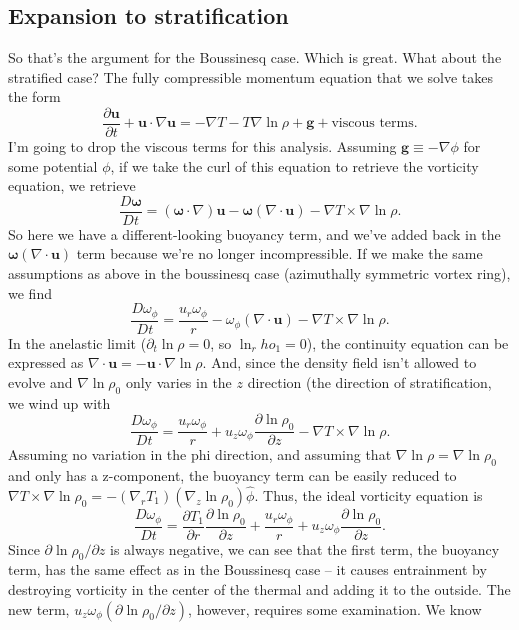 \documentclass[onecolumn, amsmath, amsfonts, amssymb]{aastex62}
\newcommand{\grad}{\ensuremath{\nabla}}
\begin{document}
\subsection{Expansion to stratification}
So that's the argument for the Boussinesq case. Which is great. What about the stratified
case?  The fully compressible momentum equation that we solve takes the form
$$
\frac{\partial\bm{u}}{\partial t} + \bm{u}\cdot\grad\bm{u} =
- \grad T - T \grad\ln\rho + \bm{g} + \text{viscous terms}.
$$
I'm going to drop the viscous terms for this analysis. Assuming $\bm{g} \equiv -\grad\phi$
for some potential $\phi$, if we take the curl of this equation to retrieve the vorticity equation,
we retrieve
$$
\frac{D\bm{\omega}}{D t} = %
(\bm{\omega}\cdot\grad)\bm{u} - \bm{\omega}(\grad\cdot\bm{u}) - \grad T \times \grad\ln\rho.
$$
So here we have a different-looking buoyancy term, and we've added back in the
$\bm{\omega}(\grad\cdot\bm{u})$ term because we're no longer incompressible. If we make the
same assumptions as above in the boussinesq case (azimuthally symmetric vortex ring), we find
$$
\frac{D\omega_\phi}{D t} = 
\frac{u_r\omega_\phi}{r} - \omega_\phi(\grad\cdot\bm{u}) - \grad T \times \grad\ln\rho.
$$
In the anelastic limit ($\partial_t \ln\rho = 0$, so $\ln_rho_1 = 0$), the continuity
equation can be expressed as $\grad\cdot\bm{u} = -\bm{u}\cdot\grad\ln\rho$. And, since the
density field isn't allowed to evolve and $\grad\ln\rho_0$ only varies in the $z$ direction
(the direction of stratification, we wind up with
$$
\frac{D\omega_\phi}{D t} = 
\frac{u_r\omega_\phi}{r} + u_z\omega_\phi\frac{\partial \ln\rho_0}{\partial z} - \grad T \times \grad\ln\rho.
$$
Assuming no variation in the phi direction, and assuming that $\grad\ln\rho = \grad\ln\rho_0$
and only has a z-component, the buoyancy term can be easily reduced to
$\grad T \times \grad\ln\rho_0 = -(\grad_r T_1)(\grad_z\ln\rho_0)\hat{\phi}$. Thus, the
ideal vorticity equation is
\begin{equation}
\frac{D \omega_\phi}{D t} = \frac{\partial T_1}{\partial r}\frac{\partial\ln\rho_0}{\partial z}
+ \frac{u_r\omega_\phi}{r} + u_z \omega_\phi \frac{\partial\ln\rho_0}{\partial z}.
\end{equation}
Since $\partial\ln\rho_0/\partial z$ is always negative, we can see that the first term, the
buoyancy term, has the same effect as in the Boussinesq case -- it causes entrainment by
destroying vorticity in the center of the thermal and adding it to the outside. The new term,
$u_z \omega_\phi (\partial\ln\rho_0/\partial z)$, however, requires some examination. We know
\end{document}
